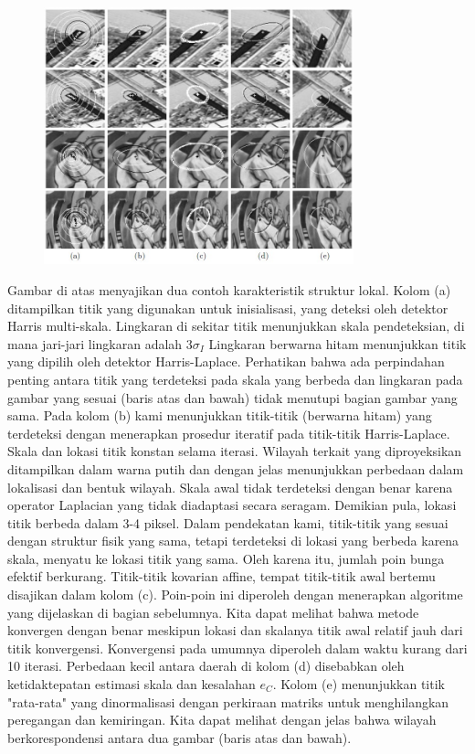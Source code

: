\begin{figure}
  \centering{}
  \includegraphics[width=0.8\textwidth]{gambar/Affine invariant interest point detection.jpg}
  \caption{}
\end{figure}

Gambar di atas menyajikan dua contoh karakteristik struktur lokal. Kolom (a) ditampilkan 
titik yang digunakan untuk inisialisasi, yang deteksi oleh detektor Harris multi-skala.
Lingkaran di sekitar titik menunjukkan skala pendeteksian, di mana jari-jari lingkaran adalah \(3\sigma_{I}\) Lingkaran berwarna hitam menunjukkan
titik yang dipilih oleh detektor Harris-Laplace. Perhatikan bahwa ada perpindahan penting antara titik yang terdeteksi pada skala yang berbeda dan lingkaran pada gambar yang sesuai (baris atas dan bawah) tidak menutupi bagian gambar yang sama. Pada kolom (b) kami menunjukkan titik-titik (berwarna hitam) yang terdeteksi dengan menerapkan prosedur iteratif pada titik-titik Harris-Laplace. Skala dan lokasi titik konstan selama iterasi. Wilayah terkait yang diproyeksikan ditampilkan dalam warna putih dan dengan jelas menunjukkan perbedaan dalam lokalisasi dan bentuk wilayah. Skala awal tidak terdeteksi dengan benar karena operator Laplacian yang tidak diadaptasi secara seragam. Demikian pula, lokasi titik berbeda dalam 3-4 piksel. Dalam pendekatan kami, titik-titik yang sesuai dengan struktur fisik yang sama, tetapi terdeteksi di lokasi yang berbeda karena skala, menyatu ke lokasi titik yang sama. Oleh karena itu, jumlah poin bunga efektif berkurang. Titik-titik kovarian affine, tempat titik-titik awal bertemu disajikan dalam kolom (c). Poin-poin ini diperoleh dengan menerapkan algoritme yang dijelaskan di bagian sebelumnya. Kita dapat melihat bahwa metode konvergen dengan benar meskipun lokasi dan skalanya
titik awal relatif jauh dari titik konvergensi. Konvergensi pada umumnya diperoleh dalam waktu kurang dari 10 iterasi. Perbedaan kecil antara daerah di kolom (d) disebabkan oleh ketidaktepatan estimasi skala dan kesalahan \(e_{C}\). Kolom (e) menunjukkan titik "rata-rata" yang dinormalisasi
dengan perkiraan matriks untuk menghilangkan peregangan dan kemiringan. Kita dapat melihat dengan jelas bahwa wilayah berkorespondensi antara dua gambar (baris atas dan bawah).